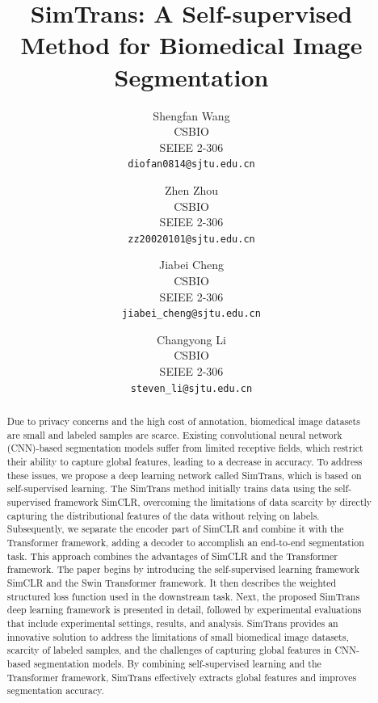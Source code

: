 \documentclass[10pt,twocolumn,a4paper]{article}
\def\confName{CVPR}
\begin{document}
\title{SimTrans: A Self-supervised Method for Biomedical Image Segmentation}

\author{Shengfan Wang\\
CSBIO\\
SEIEE 2-306\\
{\tt\small diofan0814@sjtu.edu.cn}
\and
Zhen Zhou\\
CSBIO\\
SEIEE 2-306\\
{\tt\small zz20020101@sjtu.edu.cn}
\and
Jiabei Cheng\\
CSBIO\\
SEIEE 2-306\\
{\tt\small jiabei\_cheng@sjtu.edu.cn}
\and
Changyong Li\\
CSBIO\\
SEIEE 2-306\\
{\tt\small steven\_li@sjtu.edu.cn}
}
\maketitle

\begin{abstract}
  Due to privacy concerns and the high cost of annotation, biomedical image datasets are small and labeled samples are scarce. Existing convolutional neural network (CNN)-based segmentation models suffer from limited receptive fields, which restrict their ability to capture global features, leading to a decrease in accuracy. To address these issues, we propose a deep learning network called SimTrans, which is based on self-supervised learning.
  The SimTrans method initially trains data using the self-supervised framework SimCLR, overcoming the limitations of data scarcity by directly capturing the distributional features of the data without relying on labels. Subsequently, we separate the encoder part of SimCLR and combine it with the Transformer framework, adding a decoder to accomplish an end-to-end segmentation task. This approach combines the advantages of SimCLR and the Transformer framework.
  The paper begins by introducing the self-supervised learning framework SimCLR and the Swin Transformer framework. It then describes the weighted structured loss function used in the downstream task. Next, the proposed SimTrans deep learning framework is presented in detail, followed by experimental evaluations that include experimental settings, results, and analysis.
  SimTrans provides an innovative solution to address the limitations of small biomedical image datasets, scarcity of labeled samples, and the challenges of capturing global features in CNN-based segmentation models. By combining self-supervised learning and the Transformer framework, SimTrans effectively extracts global features and improves segmentation accuracy.
\end{abstract}
\end{document}
